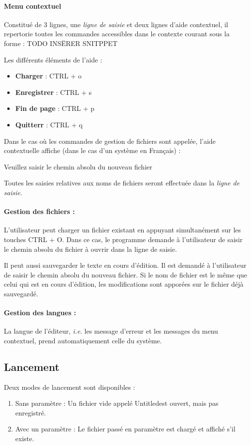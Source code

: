 \paragraph{Menu contextuel}
Constitué de 3 lignes, une \textsl{ligne de saisie} et deux lignes d'aide contextuel, il repertorie toutes les commandes accessibles dans le contexte courant sous la forme :
TODO INSËRER SNITPPET

Les différents éléments de l'aide :
\begin{itemize}
	\item \textbf{Charger} : \og CTRL + o\fg
	\item \textbf{Enregistrer} : \og CTRL + s\fg
	\item \textbf{Fin de page} : \og CTRL + p\fg
	\item \textbf{Quitterr} : \og CTRL + q\fg
\end{itemize}

Dans le cas où les commandes de gestion de fichiers sont appelée, l'aide contextuelle affiche (dans le cas d'un système en Français) :
\begin{center}
	\og Veuillez saisir le chemin absolu du nouveau fichier\fg
\end{center}
Toutes les saisies relatives aux noms de fichiers seront effectuée dans la \textsl{ligne de saisie}.

\paragraph{Gestion des fichiers :}
L'utilisateur peut charger un fichier existant en appuyant simultanément sur les touches \og CTRL + O\fg. Dans ce cas, le programme demande à l'utilisateur de saisir le chemin absolu du fichier à ouvrir dans la ligne de saisie.

Il peut aussi sauvegarder le texte en cours d'édition. Il est demandé à l'utilisateur de saisir le chemin absolu du nouveau fichier. Si le nom de fichier est le même que celui qui est en cours d'édition, les modifications sont apporées sur le fichier déjà sauvegardé.

\paragraph{Gestion des langues :}
La langue de l'éditeur, \textsl{i.e.} les message d'erreur et les messages du menu contextuel, prend automatiquement celle du système.

\subsection{Lancement}
Deux modes de lancement sont disponibles :
\begin{enumerate}
	\item Sans paramètre : Un fichier vide appelé \og Untitled\fg est ouvert, mais pas enregistré.
	\item Avec un paramètre : Le fichier passé en paramètre est chargé et affiché s'il existe.
\end{enumerate}
